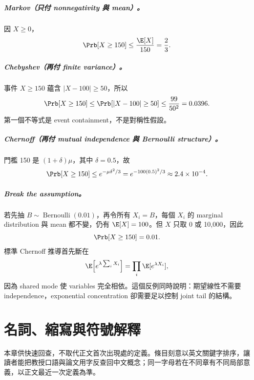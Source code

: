 \documentclass[11pt,a4paper,oneside,openany]{book}
\begin{document}
\paragraph{Markov（只付 nonnegativity 與 mean）。}
因 $X\ge0$，
\[
 \Prb[X\ge150]\le\frac{\E[X]}{150}=\frac23.
\]

\paragraph{Chebyshev（再付 finite variance）。}
事件 $X\ge150$ 蘊含 $|X-100|\ge50$，所以
\[
 \Prb[X\ge150]
 \le\Prb[|X-100|\ge50]
 \le\frac{99}{50^2}=0.0396.
\]
第一個不等式是 event containment，不是對稱性假設。

\paragraph{Chernoff（再付 mutual independence 與 Bernoulli structure）。}
門檻 150 是 $(1+\delta)\mu$，其中 $\delta=0.5$，故
\[
 \Prb[X\ge150]
 \le e^{-\mu\delta^2/3}
 =e^{-100(0.5)^2/3}
 \approx2.4\times10^{-4}.
\]

\paragraph{Break the assumption。}
若先抽 $B\sim\operatorname{Bernoulli}(0.01)$，再令所有 $X_i=B$，每個 $X_i$ 的 marginal distribution 與 mean 都不變，仍有 $\E[X]=100$。但 $X$ 只取 0 或 10,000，因此
\[
 \Prb[X\ge150]=0.01.
\]
標準 Chernoff 推導首先斷在
\[
 \E\!\left[e^{\lambda\sum_iX_i}\right]
 =\prod_i\E[e^{\lambda X_i}],
\]
因為 shared mode 使 variables 完全相依。這個反例同時說明：期望線性不需要 independence，exponential concentration 卻需要足以控制 joint tail 的結構。

\chapter*{名詞、縮寫與符號解釋}
本章供快速回查，不取代正文首次出現處的定義。條目刻意以英文關鍵字排序，讓讀者能把教授口語與論文用字反查回中文概念；同一字母若在不同章有不同局部意義，以正文最近一次定義為準。
\end{document}
